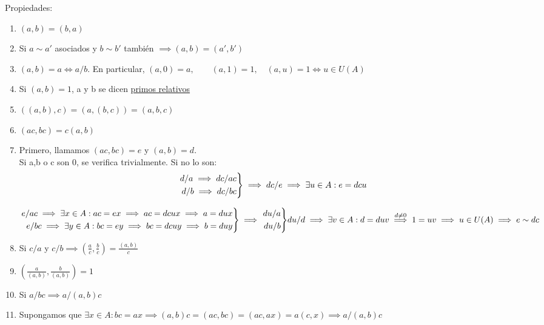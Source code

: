 \documentclass[11pt, a4paper, titlepage]{article}
\makeatletter
\renewenvironment{proof}[1][\proofname] {\vspace{-15pt}\par\pushQED{\qed}\normalfont\topsep6\p@\@plus6\p@\relax\trivlist\item[\hskip\labelsep\it#1\@addpunct{.}]\ignorespaces}{\popQED\endtrivlist\@endpefalse}
\theoremstyle{theorem-style}
\theoremstyle{definition-style}
\theoremstyle{remark-style}
\theoremstyle{example-style}
\newenvironment{nlist}
{\begin{enumerate}
\renewcommand\labelenumi{(\emph{\roman{enumi})}}}
{\end{enumerate}}
\newenvironment{rcases}
  {\left.\begin{aligned}}
  {\end{aligned}\right\rbrace}
\makeatother
\begin{document}
Propiedades:
\begin{nlist}

	\item $(a,b) = (b,a)$
	
	\item Si $a \sim a'$ asociados y $b \sim b'$ también $\implies (a,b) = (a',b')$
	
	\item $(a,b) = a \iff a/b$. En particular, $(a,0) = a, \quad  \quad (a,1) = 1, \quad (a,u) = 1 \iff u \in U(A)$
	
	\item Si $(a,b) = 1$, a y b se dicen \underline{primos relativos}
	
	\item $((a,b),c) = (a,(b,c)) = (a,b,c)$
	\item $(ac,bc) = c(a,b)$\\
	\begin{proof}
	Primero, llamamos $(ac,bc) = e$ y $(a,b) = d$.\\
	Si a,b o c son 0, se verifica trivialmente. Si no lo son:\\
	\[
	\begin{rcases}
	d/a \implies dc/ac\\
	d/b \implies dc/bc\\
\end{rcases} \implies dc/e \implies \exists u \in A : e = dcu
	\]
	
	$\begin{rcases}e / ac \implies \exists x \in A : ac = ex \implies ac = dcux \implies a = dux\\
	e/bc\implies \exists y \in A : bc = ey \implies bc = dcuy \implies b = duy\end{rcases} \implies \begin{rcases}du/a\\du/b\end{rcases} du/d \\\implies \exists v \in A : d = duv \stackrel{d\ne 0}{\implies} 1=uv \implies u\in U(A) \implies e \sim  dc$

	
\end{proof}

	\item Si $c/a$ y $c/b\implies (\frac{a}{c},\frac{b}{c}) =  \frac{(a,b)}{c}$
	
	\item
	$(\frac{a}{(a,b)}, \frac{b}{(a,b)}) = 1$
	
	\item Si $a/bc \implies a/(a,b)c$\\
	\begin{proof}
	Supongamos que $\exists x \in A : bc = ax  \implies (a,b)c = (ac,bc) = (ac,ax) = a(c,x) \implies a/(a,b)c$
	

\end{proof}
\end{nlist}
\end{document}
